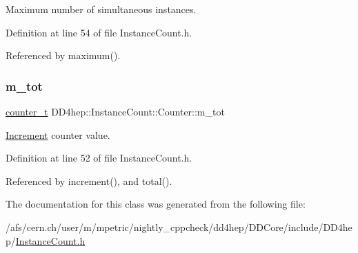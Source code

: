 Maximum number of simultaneous instances. 



Definition at line 54 of file Instance\+Count.\+h.



Referenced by maximum().

\hypertarget{class_d_d4hep_1_1_instance_count_1_1_counter_aecd05cbfb249522b056b6e0c7f163c63}{}\label{class_d_d4hep_1_1_instance_count_1_1_counter_aecd05cbfb249522b056b6e0c7f163c63} 
\subsubsection{\texorpdfstring{m\+\_\+tot}{m\_tot}}
{\footnotesize\ttfamily \hyperlink{struct_d_d4hep_1_1_instance_count_ae81dc0c76b135425e14b6dc38262a727}{counter\+\_\+t} D\+D4hep\+::\+Instance\+Count\+::\+Counter\+::m\+\_\+tot\hspace{0.3cm}{\ttfamily [private]}}



\hyperlink{struct_d_d4hep_1_1_increment}{Increment} counter value. 



Definition at line 52 of file Instance\+Count.\+h.



Referenced by increment(), and total().



The documentation for this class was generated from the following file\+:\begin{DoxyCompactItemize}
\item 
/afs/cern.\+ch/user/m/mpetric/nightly\+\_\+cppcheck/dd4hep/\+D\+D\+Core/include/\+D\+D4hep/\hyperlink{_instance_count_8h}{Instance\+Count.\+h}\end{DoxyCompactItemize}
